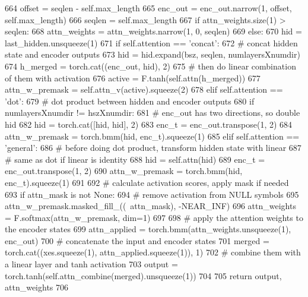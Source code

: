 \begin{DoxyCode}
664                 offset = seqlen - self.max\_length
665                 enc\_out = enc\_out.narrow(1, offset, self.max\_length)
666                 seqlen = self.max\_length
667             \textcolor{keywordflow}{if} attn\_weights.size(1) > seqlen:
668                 attn\_weights = attn\_weights.narrow(1, 0, seqlen)
669         \textcolor{keywordflow}{else}:
670             hid = last\_hidden.unsqueeze(1)
671             \textcolor{keywordflow}{if} self.attention == \textcolor{stringliteral}{'concat'}:
672                 \textcolor{comment}{# concat hidden state and encoder outputs}
673                 hid = hid.expand(bsz, seqlen, numlayersXnumdir)
674                 h\_merged = torch.cat((enc\_out, hid), 2)
675                 \textcolor{comment}{# then do linear combination of them with activation}
676                 active = F.tanh(self.attn(h\_merged))
677                 attn\_w\_premask = self.attn\_v(active).squeeze(2)
678             \textcolor{keywordflow}{elif} self.attention == \textcolor{stringliteral}{'dot'}:
679                 \textcolor{comment}{# dot product between hidden and encoder outputs}
680                 \textcolor{keywordflow}{if} numlayersXnumdir != hszXnumdir:
681                     \textcolor{comment}{# enc\_out has two directions, so double hid}
682                     hid = torch.cat([hid, hid], 2)
683                 enc\_t = enc\_out.transpose(1, 2)
684                 attn\_w\_premask = torch.bmm(hid, enc\_t).squeeze(1)
685             \textcolor{keywordflow}{elif} self.attention == \textcolor{stringliteral}{'general'}:
686                 \textcolor{comment}{# before doing dot product, transform hidden state with linear}
687                 \textcolor{comment}{# same as dot if linear is identity}
688                 hid = self.attn(hid)
689                 enc\_t = enc\_out.transpose(1, 2)
690                 attn\_w\_premask = torch.bmm(hid, enc\_t).squeeze(1)
691 
692             \textcolor{comment}{# calculate activation scores, apply mask if needed}
693             \textcolor{keywordflow}{if} attn\_mask \textcolor{keywordflow}{is} \textcolor{keywordflow}{not} \textcolor{keywordtype}{None}:
694                 \textcolor{comment}{# remove activation from NULL symbols}
695                 attn\_w\_premask.masked\_fill\_((~attn\_mask), -NEAR\_INF)
696             attn\_weights = F.softmax(attn\_w\_premask, dim=1)
697 
698         \textcolor{comment}{# apply the attention weights to the encoder states}
699         attn\_applied = torch.bmm(attn\_weights.unsqueeze(1), enc\_out)
700         \textcolor{comment}{# concatenate the input and encoder states}
701         merged = torch.cat((xes.squeeze(1), attn\_applied.squeeze(1)), 1)
702         \textcolor{comment}{# combine them with a linear layer and tanh activation}
703         output = torch.tanh(self.attn\_combine(merged).unsqueeze(1))
704 
705         \textcolor{keywordflow}{return} output, attn\_weights
706 \end{DoxyCode}


